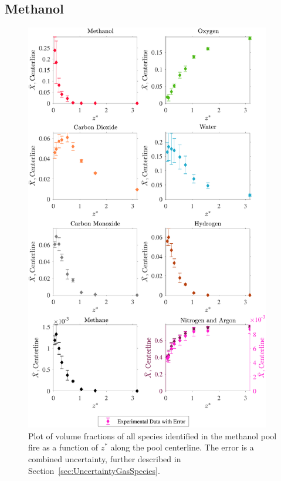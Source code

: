 \documentclass[12pt]{article}
\begin{document}
\subsection{Methanol}
\label{ssec:Methanol_ALL_Vol_Frac}
\begin{figure}[!h]
	\centering
\includegraphics[width=10.75cm,keepaspectratio]{Methanol_MOL_FRAC_Plot_2.pdf}
	\caption[Volume fractions of major species in the methanol plume]{Plot of volume fractions of all species identified in the methanol pool fire as a function of $z^{*}$ along the pool centerline. The error is a combined uncertainty, further described in Section~\ref{sec:UncertaintyGasSpecies}.}
	\label{fig:Methanol_VOL_Frac_Major}
\end{figure}
\pagebreak

\end{document}
